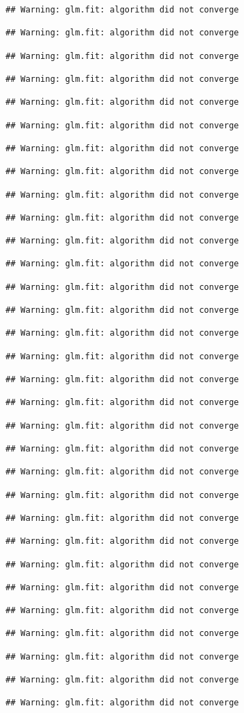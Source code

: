 \documentclass[
]{article}
\begin{document}
\begin{verbatim}
## Warning: glm.fit: algorithm did not converge

## Warning: glm.fit: algorithm did not converge

## Warning: glm.fit: algorithm did not converge

## Warning: glm.fit: algorithm did not converge

## Warning: glm.fit: algorithm did not converge

## Warning: glm.fit: algorithm did not converge

## Warning: glm.fit: algorithm did not converge

## Warning: glm.fit: algorithm did not converge

## Warning: glm.fit: algorithm did not converge

## Warning: glm.fit: algorithm did not converge

## Warning: glm.fit: algorithm did not converge

## Warning: glm.fit: algorithm did not converge

## Warning: glm.fit: algorithm did not converge

## Warning: glm.fit: algorithm did not converge

## Warning: glm.fit: algorithm did not converge

## Warning: glm.fit: algorithm did not converge

## Warning: glm.fit: algorithm did not converge

## Warning: glm.fit: algorithm did not converge

## Warning: glm.fit: algorithm did not converge

## Warning: glm.fit: algorithm did not converge

## Warning: glm.fit: algorithm did not converge

## Warning: glm.fit: algorithm did not converge

## Warning: glm.fit: algorithm did not converge

## Warning: glm.fit: algorithm did not converge

## Warning: glm.fit: algorithm did not converge

## Warning: glm.fit: algorithm did not converge

## Warning: glm.fit: algorithm did not converge

## Warning: glm.fit: algorithm did not converge

## Warning: glm.fit: algorithm did not converge

## Warning: glm.fit: algorithm did not converge

## Warning: glm.fit: algorithm did not converge
\end{verbatim}
\end{document}
